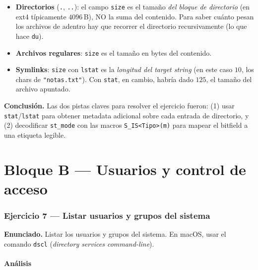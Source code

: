 \documentclass[11pt,a4paper]{article}
\begin{document}
\begin{itemize}[leftmargin=*]
    \item \textbf{Directorios} (\texttt{.}, \texttt{..}): el campo
        \texttt{size} es el tamaño \emph{del bloque de directorio} (en
        ext4 típicamente $4096$\,B), NO la suma del contenido. Para
        saber cuánto pesan los archivos de adentro hay que recorrer
        el directorio recursivamente (lo que hace \texttt{du}).
    \item \textbf{Archivos regulares}: \texttt{size} es el tamaño en
        bytes del contenido.
    \item \textbf{Symlinks}: \texttt{size} con \texttt{lstat} es la
        \emph{longitud del target string} (en este caso $10$, los
        chars de \texttt{"notas.txt"}). Con \texttt{stat}, en cambio,
        habría dado $125$, el tamaño del archivo apuntado.
\end{itemize}

\textbf{Conclusión.} Las dos pistas claves para resolver el ejercicio
fueron: (1) usar \texttt{stat}/\texttt{lstat} para obtener metadata
adicional sobre cada entrada de directorio, y (2) decodificar
\texttt{st\_mode} con las macros \texttt{S\_IS<Tipo>(m)} para mapear el
bitfield a una etiqueta legible.

\part*{Bloque B --- Usuarios y control de acceso}

\section{Ejercicio 7 --- Listar usuarios y grupos del sistema}

\textbf{Enunciado.} Listar los usuarios y grupos del sistema. En macOS,
usar el comando \texttt{dscl} (\emph{directory services command-line}).

\subsection*{Análisis}
\end{document}

